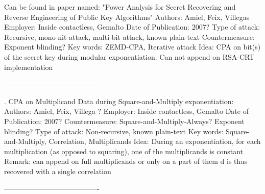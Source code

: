 Can be found in paper named:
		   "Power Analysis for Secret Recovering and Reverse Engineering of Public Key Algorithms"                          
Authors:  
					                Amiel, Feix, Villegas
Employer:
                                                                                                                      Inside contactless, Gemalto
Date of Publication:  
		     			                                      2007?
Type of attack:
                                                                 Recursive, mono-nit attack, multi-bit attack, known plain-text
Countermeasure:
                                                                                                                                   Exponent blinding?
Key words:
                                                                                                                     ZEMD-CPA, Iterative attack 
Idea:
                         		                        CPA on bit(s) of the secret key during modular exponentiation.
                                                                        	              Can not append on RSA-CRT implementation

----------------------------------------





. CPA on Multiplicand Data during Square-and-Multiply exponentiation:
Authors: 
	                                	                                   		                         Amiel, Feix, Villega ?
Employer:
                                                                                       			 Inside contactless, Gemalto
Date of Publication:
       			                             						         2007?
Countermeasure:
                                                                                    Square-and-Multiply-Always? Exponent blinding?
Type of attack:
								       Non-recursive, known plain-text
Key words:
			             	                     Square-and-Multiply, Correlation, Multiplicands
Idea:
	                             During an exponentiation, for each multiplication (as opposed to squaring), 
                                                                                                          one of the multiplicands is constant
Remark: 
					can append on full multiplicands or only on a part of them                          	                                                                                d is thus recovered with a single correlation 

----------------------------------------



